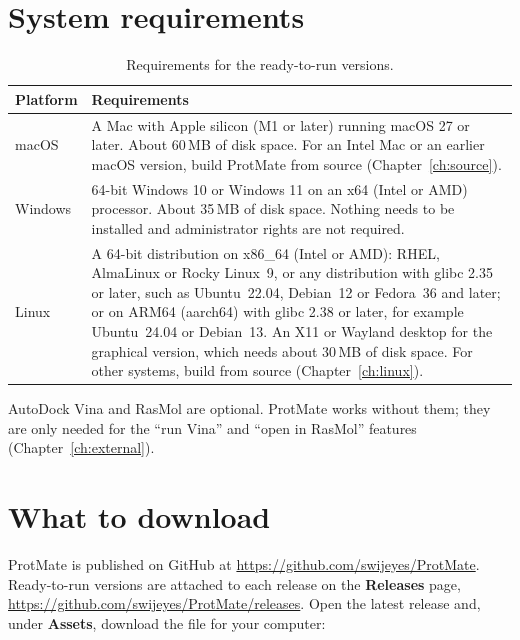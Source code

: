 \documentclass[11pt,a4paper,oneside]{report}
\newcommand{\repourl}{https://github.com/swijeyes/ProtMate}
\newcommand{\repo}{\url{\repourl}}
\newcommand{\releases}{\url{\repourl/releases}}
\newcommand{\gui}[1]{\textsf{\textbf{#1}}}  %
\begin{document}
\section{System requirements}

\begin{table}[htbp]\centering\small
\caption{Requirements for the ready-to-run versions.}\label{tab:requirements}
\begin{tabularx}{\linewidth}{@{}lX@{}}
\toprule
\textbf{Platform} & \textbf{Requirements} \\ \midrule
macOS & A Mac with Apple silicon (M1 or later) running macOS 27 or later. About 60\,MB of
        disk space. For an Intel Mac or an earlier macOS version, build ProtMate from source
        (Chapter~\ref{ch:source}). \\
Windows & 64-bit Windows 10 or Windows 11 on an x64 (Intel or AMD) processor. About 35\,MB of
          disk space. Nothing needs to be installed and administrator rights are not required. \\
Linux & A 64-bit distribution on x86\_64 (Intel or AMD): RHEL, AlmaLinux or Rocky Linux~9, or
        any distribution with glibc 2.35 or later, such as Ubuntu~22.04, Debian~12 or Fedora~36
        and later; or on
        ARM64 (aarch64) with glibc 2.38 or later, for example Ubuntu~24.04 or Debian~13. An X11
        or Wayland desktop for the graphical version, which needs about 30\,MB of disk space. For
        other systems, build from source (Chapter~\ref{ch:linux}). \\
\bottomrule
\end{tabularx}
\end{table}

AutoDock Vina and RasMol are optional. ProtMate works without them; they are only needed for the
``run Vina'' and ``open in RasMol'' features (Chapter~\ref{ch:external}).

\section{What to download}

ProtMate is published on GitHub at \repo. Ready-to-run versions are attached to each release on
the \gui{Releases} page, \releases. Open the latest release and, under \gui{Assets}, download the
file for your computer:
\end{document}
